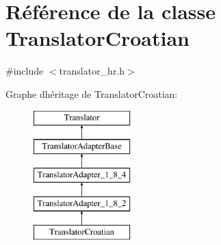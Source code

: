 \hypertarget{class_translator_croatian}{}\section{Référence de la classe Translator\+Croatian}
\label{class_translator_croatian}


{\ttfamily \#include $<$translator\+\_\+hr.\+h$>$}

Graphe d\textquotesingle{}héritage de Translator\+Croatian\+:\begin{figure}[H]
\begin{center}
\leavevmode
\includegraphics[height=5.000000cm]{class_translator_croatian}
\end{center}
\end{figure}
